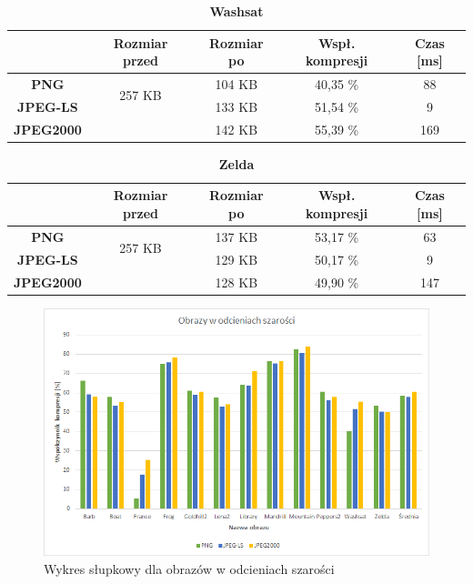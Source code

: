 \begin{table}[!h]
	\centering
	\caption{\textbf{Washsat}}
	\label{my-label}
	\begin{tabular}{|c|c|c|c|c|}                                             
		\hline
		& \textbf{Rozmiar przed} & \textbf{Rozmiar po} & \textbf{Wspł. kompresji} & \textbf{Czas {[}ms{]}} \\ \hline 
		\textbf{PNG}      &          \multicolumn{1}{c|}{\multirow{2}{*}{257 KB}}             &         104 KB            &     40,35 \%                    &          88                   \\\cline{3-5}
		\textbf{JPEG-LS}  &                        &      133 KB               &          51,54 \%               &           9               \\\cline{3-5}
		\textbf{JPEG2000} &                        &      142 KB               &          55,39 \%               &     169                 \\ \hline
	\end{tabular}
\end{table}

\begin{table}[!h]
	\centering
	\caption{\textbf{Zelda}}
	\label{my-label}
	\begin{tabular}{|c|c|c|c|c|}                                             
		\hline
		& \textbf{Rozmiar przed} & \textbf{Rozmiar po} & \textbf{Wspł. kompresji} & \textbf{Czas {[}ms{]}} \\ \hline 
		\textbf{PNG}      &          \multicolumn{1}{c|}{\multirow{2}{*}{257 KB}}             &      137 KB               &     53,17 \%                    &          63                   \\\cline{3-5}
		\textbf{JPEG-LS}  &                        &      129 KB               &       50,17 \%                  &         9                 \\\cline{3-5}
		\textbf{JPEG2000} &                        &      128 KB               &       49,90 \%                  &        147              \\ \hline
	\end{tabular}
\end{table}


\begin{figure}[!h]
	\centering
	\includegraphics[width=1.1\textwidth]{./greyset.png}
	\caption{Wykres słupkowy dla obrazów w odcieniach szarości}
	\label{img:greyset}
\end{figure}

\clearpage